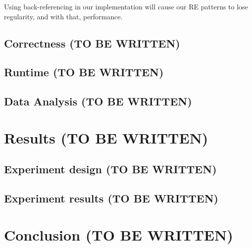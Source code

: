 \documentclass[12pt]{article}
\theoremstyle{definition}
\begin{document}
Using back-referencing in our implementation will cause our RE patterns to lose regularity, and with that, performance.

\subsection{Correctness (TO BE WRITTEN)}

\subsection{Runtime (TO BE WRITTEN)}

\subsection{Data Analysis (TO BE WRITTEN)}

\section{Results (TO BE WRITTEN)}

\subsection{Experiment design (TO BE WRITTEN)}

\subsection{Experiment results (TO BE WRITTEN)}

\section{Conclusion (TO BE WRITTEN)}

\newpage


\nocite{*}

\end{document}
